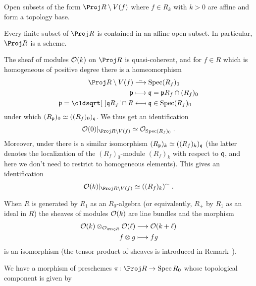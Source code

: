 \documentclass[a4paper,parskip=half,numbers=enddot, DIV=12]{scrreprt}
\begin{document}
\begin{prop}
	\begin{alphanumerate}
		\item {}Open subsets of the form $\Proj R\setminus V(f)$ where $f\in R_k$ with $k>0$ are affine and form a topology base.
		\item Every finite subset of $\Proj R$ is contained in an affine open subset. In particular, $\Proj R$ is a scheme.
		\item The sheaf of modules $\mathcal{O}(k)$ on $\Proj R$ is quasi-coherent, and for $f\in R$ which is homogeneous of positive degree there is a homeomorphism
		\begin{align}\lbl{eq:ProjLocal}
			\begin{split}
				\Proj R\setminus V(f)&\isomorphism \Spec (R_f)_0\\
				\pp &\longmapsto \qq=\pp R_f\cap (R_f)_0\\
				\pp=\sqrt{\qq R_f}\cap R&\longmapsfrom \qq\in\Spec (R_f)_0
			\end{split}
		\end{align}
		under which $(R_{\mathfrak{p}})_0\simeq ((R_f)_0)_{\mathfrak{q}}$. We thus get an identification 
		\begin{align*}
			\Oo(0)|_{\Proj R\setminus V(f)}\simeq \Oo_{\Spec (R_f)_0}\;.
		\end{align*}		
		Moreover, under  there is a similar isomorphism $(R_{\mathfrak{p}})_k\simeq ((R_f)_k)_{\mathfrak{q}}$ (the latter denotes the localization of the $(R_f)_0$-module $(R_f)_k$ with respect to $\mathfrak{q}$, and here we don't need to restrict to homogeneous elements). This gives an identification
		\begin{align}\lbl{eq:O(k)isQC}
			\Oo(k)|_{\Proj R\setminus V(f)}\simeq ((R_f)_k)^\sim\;.
		\end{align}
		\item When $R$ is generated by $R_1$ as an $R_0$-algebra (or equivalently, $R_+$ by $R_1$ as an ideal in $R$) the sheaves of modules $\mathcal{O}(k)$ are line bundles and the morphism 
		\begin{align*}
			\Oo(k)\otimes_{\Oo_{\Proj R}}\Oo(\ell)&\morphism\Oo(k+\ell)\\
			f\otimes g&\longmapsto fg
		\end{align*}
		is an isomorphism (the tensor product of sheaves is introduced in Remark~).
		\item We have a morphism of preschemes $\pi\colon\Proj R\morphism \Spec R_0$ whose topological component is given by

\end{alphanumerate}
\end{prop}
\end{document}
